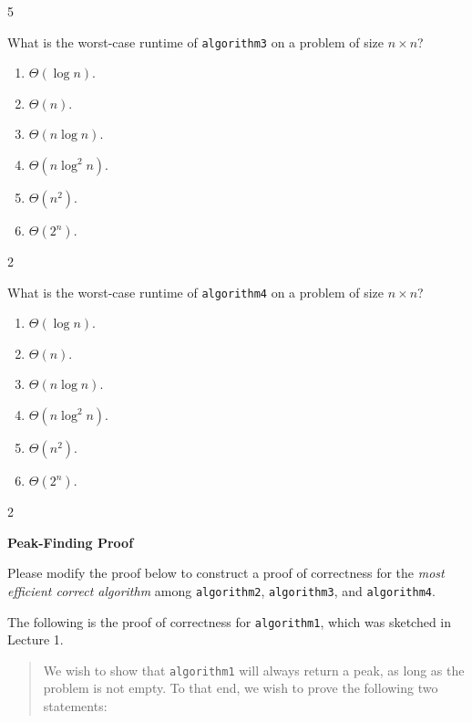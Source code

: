 \documentclass[12pt,twoside]{article}
\begin{document}
\begin{problems}
\begin{problemparts}
\ifsolution \solution{}
5
\fi

\problempart {} What is the worst-case runtime of \texttt{algorithm3} on a problem of size $n \times n$?
\begin{enumerate}
\item $\Theta(\log n)$.
\item $\Theta(n)$.
\item $\Theta(n \log n)$.
\item $\Theta(n \log^2 n)$.
\item $\Theta(n^2)$.
\item $\Theta(2^n)$.
\end{enumerate}

\ifsolution \solution{}
2
\fi

\problempart {} What is the worst-case runtime of \texttt{algorithm4} on a problem of size $n \times n$?
\begin{enumerate}
\item $\Theta(\log n)$.
\item $\Theta(n)$.
\item $\Theta(n \log n)$.
\item $\Theta(n \log^2 n)$.
\item $\Theta(n^2)$.
\item $\Theta(2^n)$.
\end{enumerate}

\ifsolution \solution{}
2
\fi

\end{problemparts}

\problem {} \textbf{Peak-Finding Proof}

Please modify the proof below to construct a proof of correctness
for the \emph{most efficient correct algorithm}
among \texttt{algorithm2}, \texttt{algorithm3}, and \texttt{algorithm4}.

The following is the proof of correctness
for \texttt{algorithm1},
which was sketched in Lecture 1.

\begin{quote}
We wish to show that \texttt{algorithm1}
will always return a peak,
as long as the problem is not empty.
To that end,
we wish to prove the following two statements:


\end{quote}
\end{problems}
\end{document}
